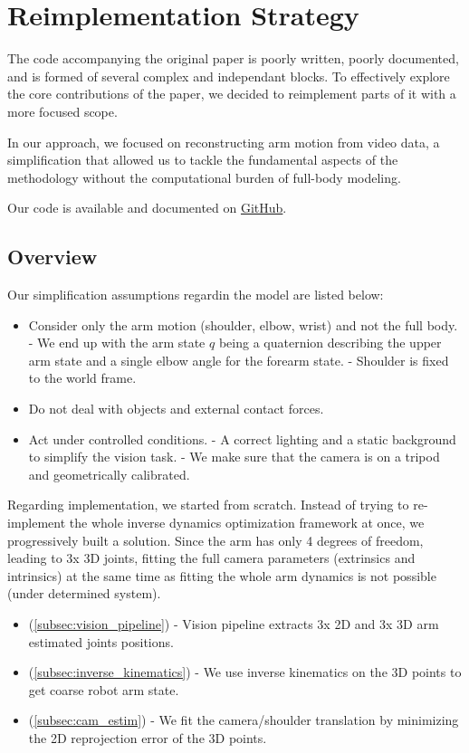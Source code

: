 \section{Reimplementation Strategy}
\label{sec:remplementation}

The code accompanying the original paper  is poorly written, poorly documented, and is formed of several complex and independant blocks. 
To effectively explore the core contributions of the paper,
we decided to reimplement parts of it with a more focused scope.

In our approach, we focused on reconstructing arm motion from video data,
a simplification that allowed us to tackle the fundamental 
aspects of the methodology without the computational burden of full-body modeling.

Our code is available and documented on \href{https://github.com/balthazarneveu/monocular_pose_and_forces_estimation}{GitHub}.

\subsection{Overview}
\label{subsec:overview}
Our simplification assumptions regardin the model are listed below:
\begin{itemize}
    \item Consider only the arm motion (shoulder, elbow, wrist) and not the full body.
    \subitem - We end up with the arm state $q$ being a quaternion describing 
    the upper arm state and a single elbow angle for the forearm state.
    \subitem - Shoulder is fixed to the world frame.
    \item Do not deal with objects and external contact forces.
    \item Act under controlled conditions.
    \subitem - A correct lighting and a static background to simplify the vision task.
    \subitem - We make sure that the camera is on a tripod and geometrically calibrated.
\end{itemize}

Regarding implementation, we started from scratch. Instead of trying to re-implement
the whole inverse dynamics optimization framework at once, we progressively built a solution.
Since the arm has only 4 degrees of freedom, leading to 3x 3D joints, 
fitting the full camera parameters (extrinsics and intrinsics) at the same time
as fitting the whole arm dynamics is not possible (under determined system).
\begin{itemize}
    \item (\ref{subsec:vision_pipeline}) - Vision pipeline 
    extracts 3x 2D and 3x 3D arm estimated joints positions.
    \item (\ref{subsec:inverse_kinematics}) - We use inverse kinematics  
    on the 3D points to get coarse robot arm state.
    \item (\ref{subsec:cam_estim}) - We fit the camera/shoulder translation 
    by minimizing the 2D reprojection error of the 3D points.
\end{itemize}



